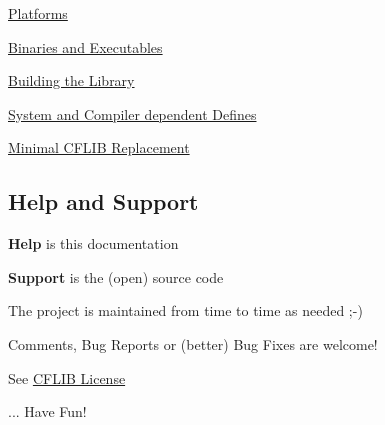 \begin{DoxyItemize}
\item \hyperlink{development_platforms}{Platforms}
\item \hyperlink{development_binaries}{Binaries and Executables}
\item \hyperlink{development_library_building}{Building the Library}
\item \hyperlink{development_compilation_options}{System and Compiler dependent Defines}
\item \hyperlink{development_minimal_replacement}{Minimal C\-F\-L\-I\-B Replacement}
\end{DoxyItemize}\hypertarget{index_help}{}\subsection{Help and Support}\label{index_help}

\begin{DoxyItemize}
\item {\bfseries Help} is this documentation
\item {\bfseries Support} is the (open) source code
\item The project is maintained from time to time as needed ;-\/)
\item Comments, Bug Reports or (better) Bug Fixes are welcome!
\item See \hyperlink{license}{C\-F\-L\-I\-B License}
\item ... Have Fun! 
\end{DoxyItemize}